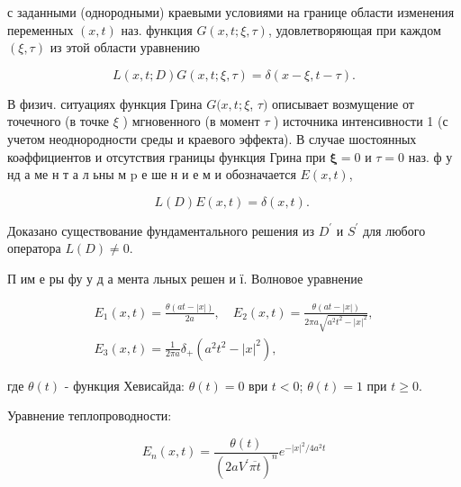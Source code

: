 \documentclass[10pt]{article}
\begin{document}
с заданными (однородными) краевыми условиями на границе области изменения переменных $(x, t)$ наз. функция $G(x, t ; \xi, \tau)$, удовлетворяющая при каждом $(\xi, \tau)$ из этой области уравнению



\[

L(x, t ; D) G(x, t ; \xi, \tau)=\delta(x-\xi, t-\tau) .

\]



В физич. ситуациях функция Грина $G(x, t ; \xi$, $\tau)$ описывает возмущение от точечного (в точке $\xi$ ) мгновенного (в момент $\tau$ ) источника интенсивности 1 (с учетом неоднородности среды и краевого эффекта). В случае шостоянных коәффициентов и отсутствия границы функция Грина при $\boldsymbol{\xi}=0$ и $\tau=0$ наз. ф у нд а ме н т а л ьны м $\mathrm{p}$ е ше н и е м и обозначается $E(x, t)$,



\[

L(D) E(x, t)=\delta(x, t) \text {. }

\]



Доказано существование фундаментального решения из $D^{\prime}$ и $S^{\prime}$ для любого оператора $L(D) \neq 0$.



П им е ры фу у д а мента льных решен и ї. Волновое уравнение



\[

\begin{gathered}

E_{1}(x, t)=\frac{\theta(a t-|x|)}{2 a}, \quad E_{2}(x, t)=\frac{\theta(a t-|x|)}{2 \pi a \sqrt{a^{2} t^{2}-|x|^{2}}}, \\

E_{3}(x, t)=\frac{1}{2 \pi a} \delta_{+}\left(a^{2} t^{2}-|x|^{2}\right),

\end{gathered}

\]



где $\theta(t)$ - функция Хевисайда: $\theta(t)=0$ ври $t<0$; $\theta(t)=1$ при $t \geqslant 0$.



Уравнение теплопроводности:



\[

E_{n}(x, t)=\frac{\theta(t)}{\left(2 a V^{\prime} \overline{\pi t}\right)^{n}} e^{-|x|^{2} / 4 a^{2} t}

\]
\end{document}
